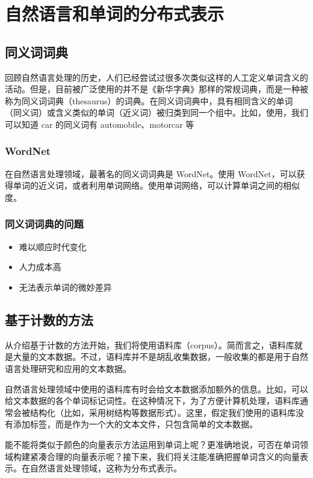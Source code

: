 \chapter{自然语言和单词的分布式表示\label{Ch02}}
\section{同义词词典}
回顾自然语言处理的历史，人们已经尝试过很多次类似这样的人工定义单词含义的活动。但是，目前被广泛使用的并不是《新华字典》那样的常规词典，而是一种被称为同义词词典（thesaurus）的词典。在同义词词典中，具有相同含义的单词（同义词）或含义类似的单词（近义词）被归类到同一个组中。比如，使用，我们可以知道 car 的同义词有 automobile、motorcar 等
\subsection{WordNet}
在自然语言处理领域，最著名的同义词词典是 WordNet。使用 WordNet，可以获得单词的近义词，或者利用单词网络。使用单词网络，可以计算单词之间的相似度。
\subsection{同义词词典的问题}
\begin{itemize}
    \item 难以顺应时代变化
    \item 人力成本高
    \item 无法表示单词的微妙差异
\end{itemize}
\section{基于计数的方法}
从介绍基于计数的方法开始，我们将使用语料库（corpus）。简而言之，语料库就是大量的文本数据。不过，语料库并不是胡乱收集数据，一般收集的都是用于自然语言处理研究和应用的文本数据。

\begin{tcolorbox}
    自然语言处理领域中使用的语料库有时会给文本数据添加额外的信息。比如，可以给文本数据的各个单词标记词性。在这种情况下，为了方便计算机处理，语料库通常会被结构化（比如，采用树结构等数据形式）。这里，假定我们使用的语料库没有添加标签，而是作为一个大的文本文件，只包含简单的文本数据。
\end{tcolorbox}

能不能将类似于颜色的向量表示方法运用到单词上呢？更准确地说，可否在单词领域构建紧凑合理的向量表示呢？接下来，我们将关注能准确把握单词含义的向量表示。在自然语言处理领域，这称为分布式表示。

